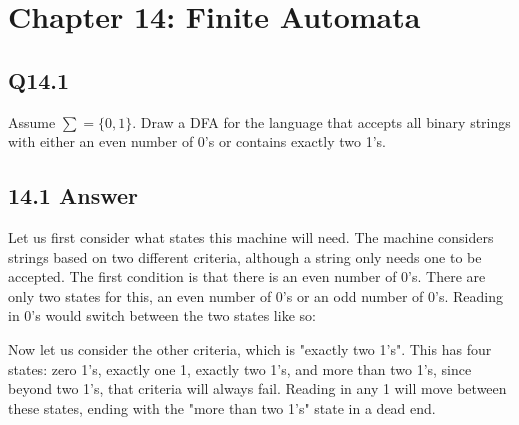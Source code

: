 \documentclass{article}
\begin{document}
\section*{Chapter 14: Finite Automata}
\subsection*{Q14.1}
Assume $\sum=\{0,1\}$. Draw a DFA for the language that accepts all binary strings with either an even number of 0's or contains exactly two 1's.
\newpage
\subsection*{14.1 Answer}
Let us first consider what states this machine will need. The machine considers strings based on two different criteria, although a string only needs one to be accepted. The first condition is that there is an even number of 0's. There are only two states for this, an even number of 0's or an odd number of 0's. Reading in 0's would switch between the two states like so:
\begin{center}
\end{center}
Now let us consider the other criteria, which is "exactly two 1's". This has four states: zero 1's, exactly one 1, exactly two 1's, and more than two 1's, since beyond two 1's, that criteria will always fail. Reading in any 1 will move between these states, ending with the "more than two 1's" state in a dead end.
\end{document}
